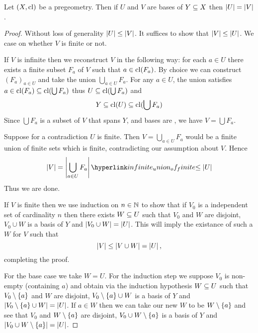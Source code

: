 \begin{prop}
    Let $(X,\operatorname{cl})$ be a pregeometry.
    Then if $U$ and $V$ are bases of $Y \subseteq X$ then $\left\vert U \right\vert = \left\vert V \right\vert$.
\end{prop}
\begin{proof}
    Without loss of generality $\left\vert U \right\vert \leq \left\vert V \right\vert$.
    It suffices to show that $\left\vert V \right\vert \leq \left\vert U \right\vert$.
    We case on whether $V$ is finite or not.

    If $V$ is infinite then we reconstruct $V$ in the following way:
    for each $a \in U$ there exists a finite subset $F_a$ of $V$ such that 
    $a \in \operatorname{cl}(F_a)$.
    By choice we can construct $(F_a)_{a \in U}$ and take the union 
    $\bigcup_{a \in U} F_a$.
    For any $a \in U$, the union satisfies 
    $a \in \operatorname{cl}(F_a) \subseteq \operatorname{cl}(\bigcup F_a)$
    thus $U \subseteq \operatorname{cl}(\bigcup F_a)$ and
    \[Y \subseteq \operatorname{cl}(U) \subseteq \operatorname{cl}(\bigcup F_a)\]
    Since $\bigcup F_a$ is a subset of $V$ that spans $Y$, 
    and bases are , 
    we have $V = \bigcup F_a$.

    Suppose for a contradiction $U$ is finite. 
    Then $V = \bigcup_{a \in U} F_a$ would be a finite union of finite sets 
    which is finite,
    contradicting our assumption about $V$.
    Hence 
    \[
        \abs{V}  = \abs{\bigcup_{a \in U} F_a} 
        \linkto{infinite_union_of_finite}{\leq \abs{U}}
    \]
    Thus we are done.

    If $V$ is finite then we use induction on $n \in \mathbb{N}$ to show that 
    if $V_0$ is a independent set of cardinality $n$ then there exists 
    $W \subseteq U$ such that $V_0$ and $W$ are disjoint, 
    $V_0 \cup W$ is a basis of $Y$ 
    and $\left\vert V_0 \cup W \right\vert = \left\vert U \right\vert$.
    This will imply the existance of such a $W$ for $V$ such that 
    \[\left\vert V \right\vert \leq \left\vert V \cup W \right\vert = \left\vert U \right\vert,\]
    completing the proof.

    For the base case we take $W = U$.
    For the induction step we suppose $V_0$ is non-empty (containing $a$) and 
    obtain via the induction hypothesis 
    $W \subseteq U$ such that $V_0 \setminus \left\{a\right\}$ and $W$ are disjoint, 
    $V_0 \setminus \left\{a\right\} \cup W$ is a basis of $Y$ 
    and $\left\vert V_0 \setminus \left\{a\right\} \cup W \right\vert = \left\vert U \right\vert$.
    If $a \in W$ then we can take our new $W$ to be $W \setminus \left\{a\right\}$
    and see that $V_0$ and $W \setminus \left\{a\right\}$ are disjoint, 
    $V_0 \cup W \setminus \left\{a\right\}$ is a basis of $Y$ 
    and $\left\vert V_0 \cup W \setminus \left\{a\right\} \right\vert = \left\vert U \right\vert$.
    

\end{proof}
